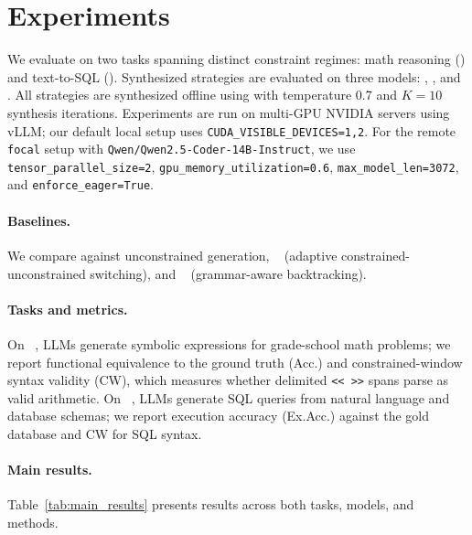\section{Experiments}
\label{sec:experiments}

We evaluate \Tool on two tasks spanning distinct constraint regimes: math reasoning (\GSM) and text-to-SQL (\Spider).
Synthesized strategies are evaluated on three models: \QwenSmall, \QwenCoder, and \QwenBig.
All strategies are synthesized offline using \SynthGPT with temperature 0.7 and $K=10$ synthesis iterations.
Experiments are run on multi-GPU NVIDIA servers using vLLM; our default local setup uses \texttt{CUDA\_VISIBLE\_DEVICES=1,2}. For the remote \texttt{focal} setup with \texttt{Qwen/Qwen2.5-Coder-14B-Instruct}, we use \texttt{tensor\_parallel\_size=2}, \texttt{gpu\_memory\_utilization=0.6}, \texttt{max\_model\_len=3072}, and \texttt{enforce\_eager=True}.

\paragraph{Baselines.}
We compare against unconstrained generation, \Crane~\cite{crane2025} (adaptive constrained-unconstrained switching), and \IterGen~\cite{itergen2025} (grammar-aware backtracking).

\paragraph{Tasks and metrics.}
On \GSM~\cite{gsm_symbolic2024}, LLMs generate symbolic expressions for grade-school math problems; we report functional equivalence to the ground truth (Acc.) and constrained-window syntax validity (CW), which measures whether delimited \texttt{<< >>} spans parse as valid arithmetic.
On \Spider~\cite{spider2018}, LLMs generate SQL queries from natural language and database schemas; we report execution accuracy (Ex.Acc.) against the gold database and CW for SQL syntax.

\paragraph{Main results.}
Table~\ref{tab:main_results} presents results across both tasks, models, and methods.

